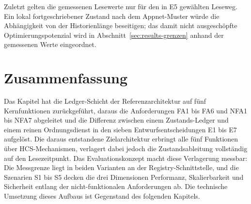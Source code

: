 Zuletzt gelten die gemessenen Lesewerte nur für den in E5 gewählten Leseweg. Ein lokal fortgeschriebener Zustand nach dem Appnet-Muster würde die Abhängigkeit von der Historienlänge beseitigen; das damit nicht ausgeschöpfte Optimierungspotenzial wird in Abschnitt~\ref{sec:results-grenzen} anhand der gemessenen Werte eingeordnet.


\section{Zusammenfassung}
\label{sec:konzipierung-zusammenfassung}

Das Kapitel hat die Ledger-Schicht der Referenzarchitektur auf fünf Kernfunktionen zurückgeführt, daraus die Anforderungen FA1 bis FA6 und NFA1 bis NFA7 abgeleitet und die Differenz zwischen einem Zustands-Ledger und einem reinen Ordnungsdienst in den sieben Entwurfsentscheidungen E1 bis E7 aufgelöst. Die daraus entstandene Zielarchitektur erbringt alle fünf Funktionen über HCS-Mechanismen, verlagert dabei jedoch die Zustandsableitung vollständig auf den Lesezeitpunkt. Das Evaluationskonzept macht diese Verlagerung messbar: Die Messgrenze liegt in beiden Varianten an der Registry-Schnittstelle, und die Szenarien S1 bis S5 decken die drei Dimensionen Performanz, Skalierbarkeit und Sicherheit entlang der nicht-funktionalen Anforderungen ab. Die technische Umsetzung dieses Aufbaus ist Gegenstand des folgenden Kapitels.